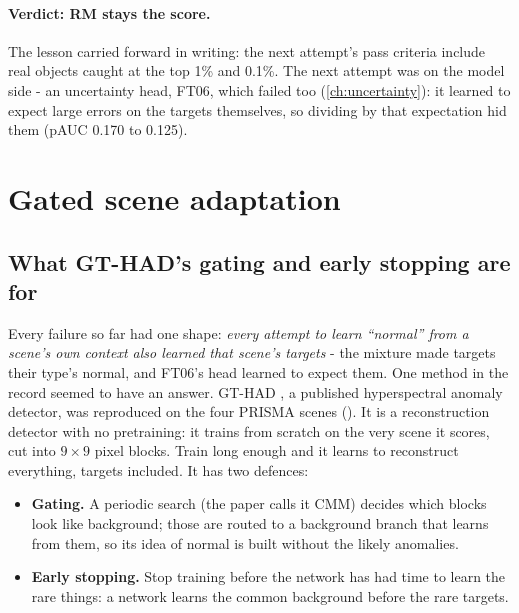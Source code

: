 \paragraph{Verdict: RM stays the score.} The lesson carried forward in writing: the next attempt's pass criteria include
real objects caught at the top 1\% and 0.1\%. The next attempt was on the model side - an uncertainty head, FT06, which
failed too (\cref{ch:uncertainty}): it learned to expect large errors on the targets themselves, so dividing by that
expectation hid them (pAUC 0.170 to 0.125).

\section{Gated scene adaptation}\label{sec:scoringgains:adapt}

\subsection{What GT-HAD's gating and early stopping are for}

Every failure so far had one shape: \emph{every attempt to learn ``normal'' from a scene's own context also learned that
scene's targets} - the mixture made targets their type's normal, and FT06's head learned to expect them. One method in the
record seemed to have an answer. GT-HAD \citep{lian2025gated}, a published hyperspectral anomaly detector, was reproduced on
the four PRISMA scenes (). It is a reconstruction detector with no
pretraining: it trains from scratch on the very scene it scores, cut into $9 \times 9$ pixel blocks. Train long enough and
it learns to reconstruct everything, targets included. It has two defences:

\begin{itemize}
\item \textbf{Gating.}  A periodic search (the paper calls it CMM) decides which blocks look like background;
  those are routed to a background branch that learns from them, so its idea of normal is built without the likely
  anomalies.
\item \textbf{Early stopping.}  Stop training before the network has had time to learn the rare
  things: a network learns the common background before the rare targets.
\end{itemize}

